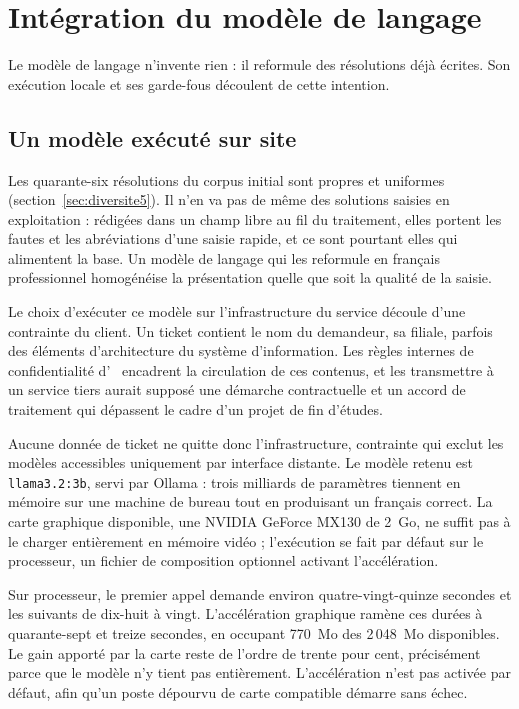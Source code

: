 \section{Intégration du modèle de langage}

\label{sec:llm5}

Le modèle de langage n'invente rien : il reformule des résolutions déjà écrites. Son
exécution locale et ses garde-fous découlent de cette intention.

\subsection{Un modèle exécuté sur site}

Les quarante-six résolutions du corpus initial sont propres et uniformes
(section~\ref{sec:diversite5}). Il n'en va pas de même des solutions saisies en exploitation :
rédigées dans un champ libre au fil du traitement, elles portent les fautes et les abréviations
d'une saisie rapide, et ce sont pourtant elles qui alimentent la base. Un modèle de langage qui les
reformule en français professionnel homogénéise la présentation quelle que soit la qualité de la
saisie.

Le choix d'exécuter ce modèle sur l'infrastructure du service découle d'une contrainte du client.
Un ticket contient le nom du demandeur, sa filiale, parfois des éléments d'architecture du système
d'information. Les règles internes de confidentialité d'\otbs~\cite{otbs-integration} encadrent la
circulation de ces contenus, et les transmettre à un service tiers aurait supposé une démarche
contractuelle et un accord de traitement qui dépassent le cadre d'un projet de fin d'études.

Aucune donnée de ticket ne quitte donc l'infrastructure, contrainte qui exclut les modèles
accessibles uniquement par interface distante. Le modèle retenu est \texttt{llama3.2:3b}, servi par
Ollama : trois milliards de paramètres tiennent en mémoire sur une machine de bureau tout en
produisant un français correct. La carte graphique disponible, une NVIDIA GeForce MX130 de 2~Go, ne
suffit pas à le charger entièrement en mémoire vidéo ; l'exécution se fait par défaut sur le
processeur, un fichier de composition optionnel activant l'accélération.

Sur processeur, le premier appel demande environ quatre-vingt-quinze secondes et les suivants de
dix-huit à vingt. L'accélération graphique ramène ces durées à quarante-sept et treize secondes, en
occupant 770~Mo des 2\,048~Mo disponibles. Le gain apporté par la carte reste de l'ordre de trente
pour cent, précisément parce que le modèle n'y tient pas entièrement. L'accélération n'est pas
activée par défaut, afin qu'un poste dépourvu de carte compatible démarre sans échec.

